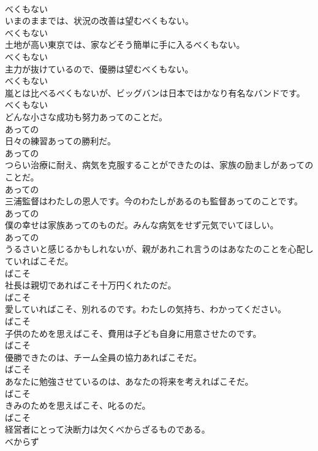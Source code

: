 \documentclass[8pt]{extreport}
\begin{document}
\begin{CJK}{UTF8}{min}
\\	べくもない
\\	いまのままでは、状況の改善は望むべくもない。	
\\	べくもない
\\	土地が高い東京では、家などそう簡単に手に入るべくもない。	
\\	べくもない
\\	主力が抜けているので、優勝は望むべくもない。	
\\	べくもない
\\	嵐とは比べるべくもないが、ビッグバンは日本ではかなり有名なバンドです。	
\\	べくもない
\\	どんな小さな成功も努力あってのことだ。	
\\	あっての
\\	日々の練習あっての勝利だ。	
\\	あっての
\\	つらい治療に耐え、病気を克服することができたのは、家族の励ましがあってのことだ。	
\\	あっての
\\	三浦監督はわたしの恩人です。今のわたしがあるのも監督あってのことです。	
\\	あっての
\\	僕の幸せは家族あってのものだ。みんな病気をせず元気でいてほしい。	
\\	あっての
\\	うるさいと感じるかもしれないが、親があれこれ言うのはあなたのことを心配していればこそだ。	
\\	ばこそ
\\	社長は親切であればこそ十万円くれたのだ。	
\\	ばこそ
\\	愛していればこそ、別れるのです。わたしの気持ち、わかってください。	
\\	ばこそ
\\	子供のためを思えばこそ、費用は子ども自身に用意させたのです。	
\\	ばこそ
\\	優勝できたのは、チーム全員の協力あればこそだ。	
\\	ばこそ
\\	あなたに勉強させているのは、あなたの将来を考えればこそだ。	
\\	ばこそ
\\	きみのためを思えばこそ、叱るのだ。	
\\	ばこそ
\\	経営者にとって決断力は欠くべからざるものである。	
\\	べからず

\end{CJK}
\end{document}

